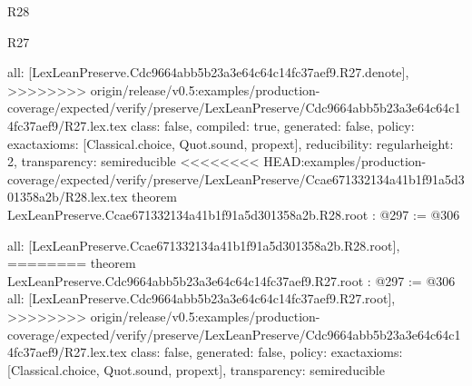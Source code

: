 \begin{lexlean}{R28}
\begin{lexlean}{R27}
\begin{coremodule}
{{{{{  all: [LexLeanPreserve.Cdc9664abb5b23a3e64c64c14fc37aef9.R27.denote],
>>>>>>>> origin/release/v0.5:examples/production-coverage/expected/verify/preserve/LexLeanPreserve/Cdc9664abb5b23a3e64c64c14fc37aef9/R27.lex.tex
  class: false,
  compiled: true,
  generated: false,
  policy: exact{axioms: [Classical.choice, Quot.sound, propext]},
  reducibility: regular{height: 2},
  transparency: semireducible
}
<<<<<<<< HEAD:examples/production-coverage/expected/verify/preserve/LexLeanPreserve/Ccae671332134a41b1f91a5d301358a2b/R28.lex.tex
theorem LexLeanPreserve.Ccae671332134a41b1f91a5d301358a2b.R28.root : @297 := @306 {
  all: [LexLeanPreserve.Ccae671332134a41b1f91a5d301358a2b.R28.root],
========
theorem LexLeanPreserve.Cdc9664abb5b23a3e64c64c14fc37aef9.R27.root : @297 := @306 {
  all: [LexLeanPreserve.Cdc9664abb5b23a3e64c64c14fc37aef9.R27.root],
>>>>>>>> origin/release/v0.5:examples/production-coverage/expected/verify/preserve/LexLeanPreserve/Cdc9664abb5b23a3e64c64c14fc37aef9/R27.lex.tex
  class: false,
  generated: false,
  policy: exact{axioms: [Classical.choice, Quot.sound, propext]},
  transparency: semireducible
}

}}}}}
\end{coremodule}
\end{lexlean}
\end{lexlean}
